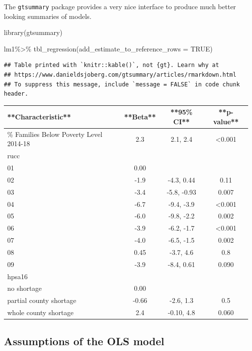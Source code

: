 \documentclass[
]{article}
\newenvironment{Shaded}{\begin{snugshade}}{\end{snugshade}}
\newcommand{\AttributeTok}[1]{\textcolor[rgb]{0.77,0.63,0.00}{#1}}
\newcommand{\ConstantTok}[1]{\textcolor[rgb]{0.00,0.00,0.00}{#1}}
\newcommand{\FunctionTok}[1]{\textcolor[rgb]{0.00,0.00,0.00}{#1}}
\newcommand{\NormalTok}[1]{#1}
\newcommand{\SpecialCharTok}[1]{\textcolor[rgb]{0.00,0.00,0.00}{#1}}
\begin{document}
The \texttt{gtsummary} package \citep{gtsummary} provides a very nice interface to produce much better looking summaries of models.

\begin{Shaded}
\begin{Highlighting}[]
\FunctionTok{library}\NormalTok{(gtsummary)}

\NormalTok{lm1}\SpecialCharTok{\%\textgreater{}\%}
  \FunctionTok{tbl\_regression}\NormalTok{(}\AttributeTok{add\_estimate\_to\_reference\_rows =} \ConstantTok{TRUE}\NormalTok{)}
\end{Highlighting}
\end{Shaded}

\begin{verbatim}
## Table printed with `knitr::kable()`, not {gt}. Learn why at
## https://www.danieldsjoberg.com/gtsummary/articles/rmarkdown.html
## To suppress this message, include `message = FALSE` in code chunk header.
\end{verbatim}

\begin{tabular}{l|c|c|c}
\hline
**Characteristic** & **Beta** & **95\% CI** & **p-value**\\
\hline
\% Families Below Poverty Level 2014-18 & 2.3 & 2.1, 2.4 & <0.001\\
\hline
rucc &  &  & \\
\hline
01 & 0.00 &  & \\
\hline
02 & -1.9 & -4.3, 0.44 & 0.11\\
\hline
03 & -3.4 & -5.8, -0.93 & 0.007\\
\hline
04 & -6.7 & -9.4, -3.9 & <0.001\\
\hline
05 & -6.0 & -9.8, -2.2 & 0.002\\
\hline
06 & -3.9 & -6.2, -1.7 & <0.001\\
\hline
07 & -4.0 & -6.5, -1.5 & 0.002\\
\hline
08 & 0.45 & -3.7, 4.6 & 0.8\\
\hline
09 & -3.9 & -8.4, 0.61 & 0.090\\
\hline
hpsa16 &  &  & \\
\hline
no shortage & 0.00 &  & \\
\hline
partial county shortage & -0.66 & -2.6, 1.3 & 0.5\\
\hline
whole county shortage & 2.4 & -0.10, 4.8 & 0.060\\
\hline
\end{tabular}

\hypertarget{assumptions-of-the-ols-model}{%
\subsection{Assumptions of the OLS model}\label{assumptions-of-the-ols-model}}
\end{document}
